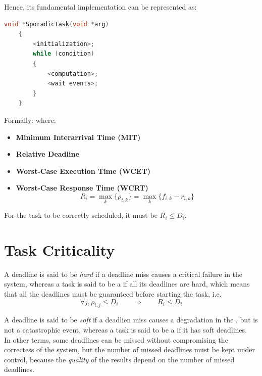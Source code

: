 Hence, its fundamental implementation can be represented as:
\begin{lstlisting}[language=C++]
    void *SporadicTask(void *arg)
    {
        <initialization>;
        while (condition)
        {
            <computation>;
            <wait events>;
        }
    }
\end{lstlisting}
Formally: 
where:
\begin{itemize}
    \item{\textbf{Minimum Interarrival Time (MIT)}}
    \item{\textbf{Relative Deadline}}
    \item{\textbf{Worst-Case Execution Time (WCET)}}
    \item{\textbf{Worst-Case Response Time (WCRT)}}
    \[R_i = \max_k \{\rho_{i,k}\}=\max_k \{f_{i,k} - r_{i,k}\}\]
\end{itemize}
For the task to be correctly scheduled, it must be $R_i \le D_i$.

\section{Task Criticality}
A deadline is said to be \textit{hard} if a deadline miss causes a critical failure in the system, whereas a task is said to be a  if all its deadlines are hard, which means that all the deadlines must be guaranteed before starting the task, i.e.
\[\forall j, \rho_{i,j} \le D_i \qquad\Rightarrow\qquad R_i \le D_i\]




A deadline is said to be \textit{soft} if a deadlien miss causes a degradation in the , but is not a catastrophic event, whereas a task is said to be a  if it has soft deadlines.\\
In other terms, some deadlines can be missed without compromising the correctess of the system, but the number of missed deadlines must be kept under control, because the \textit{quality} of the results depend on the number of missed deadlines.

